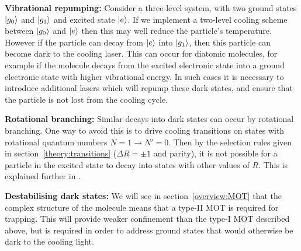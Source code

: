 \textbf{Vibrational repumping:} Consider a three-level system, with two ground
states $\ket{g_0}$ and $\ket{g_1}$ and excited state $\ket{e}$. If we implement
a two-level cooling scheme between $\ket{g_0}$ and $\ket{e}$ then this may well
reduce the particle's temperature. However if the particle can decay from
$\ket{e}$ into $\ket{g_1}$, then this particle can become dark to the cooling
laser. This can occur for diatomic molecules, for example if the molecule
decays from the excited electronic state into a ground electronic state with
higher vibrational energy. In such cases it is necessary to introduce
additional lasers which will repump these dark states, and ensure that the
particle is not lost from the cooling cycle.

\textbf{Rotational branching:} Similar decays into dark states can occur by
rotational branching. One way to avoid this is to drive cooling transitions on
states with rotational quantum numbers $N=1 \rightarrow N'=0$. Then by the
selection rules given in section~\ref{theory:transitions} ($\Delta R =  \pm1$
and parity), it is not possible for a particle in the excited state to decay
into states with other values of $R$. This is explained further in
.

\textbf{Destabilising dark states:} We will see in section~\ref{overview:MOT}
that the complex structure of the molecule means that a type-II MOT is required
for trapping. This will provide weaker confinement than the type-I MOT
described above, but is required in order to address ground states that would
otherwise be dark to the cooling light.

